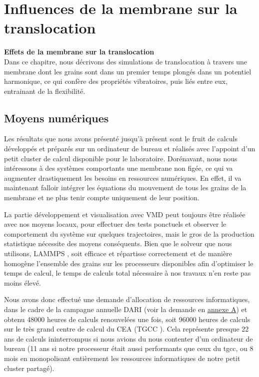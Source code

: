 
\chapter{Influences de la membrane sur la translocation}
\label{effetsmembrane}

\cleardoublepage

{\Large\textbf{{Effets de la membrane sur la translocation}}}\\

\lettrine[loversize=0.6,lraise=0.1,findent=0.5em,nindent=0em]{D}{}ans ce chapitre, nous décrivons des simulations de translocation à travers une membrane dont les grains sont dans un premier temps plongés dans un potentiel harmonique, ce qui confère des propriétés vibratoires, puis liés entre eux, entrainant de la flexibilité.\\

\minitoc

\newpage

\section{Moyens numériques}

Les résultats que nous avons présenté jusqu'à présent sont le fruit de calculs développés et préparés sur un ordinateur de bureau et réalisés avec l'appoint d'un petit cluster de calcul disponible pour le laboratoire. Dorénavant, nous nous intéressons à des systèmes comportants une membrane non figée, ce qui va augmenter drastiquement les besoins en ressources numériques. En effet, il va maintenant falloir intégrer les équations du mouvement de tous les grains de la membrane et ne plus tenir compte uniquement de leur position.


La partie développement et visualisation avec VMD \cite{HUMP96,STON2001} peut toujours être réalisée avec nos moyens locaux, pour effectuer des tests ponctuels et observer le comportement du système sur quelques trajectoires, mais le gros de la production statistique nécessite des moyens conséquents. Bien que le solveur que nous utilisons, LAMMPS \cite{lammps}, soit efficace et répartisse correctement et de manière homogène l'ensemble des grains sur les processeurs disponibles afin d'optimiser le temps de calcul, le temps de calculs total nécessaire à nos travaux n'en reste pas moins élevé.

Nous avons donc effectué une demande d'allocation de ressources informatiques, dans le cadre de la campagne annuelle DARI \cite{dari} (voir la demande en \hyperref[annexea]{annexe A}) et obtenu 48000 heures de calculs renouvelées une fois, soit 96000 heures de calculs sur le très grand centre de calcul du CEA (TGCC \cite{tgcc}). Cela représente presque 22 ans de calculs ininterrompus si nous avions du nous contenter d'un ordinateur de bureau (11 ans si notre processeur était aussi performants que ceux du tgcc, ou 8 mois en monopolisant entièrement les ressources informatiques de notre petit cluster partagé).

